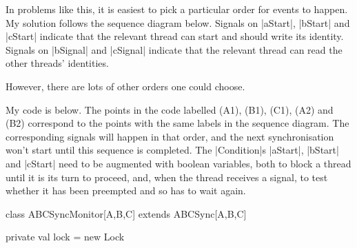 \begin{answerI}
In problems like this, it is easiest to pick a particular order for events to
happen.  My solution follows the sequence diagram below.  Signals on |aStart|,
|bStart| and |cStart| indicate that the relevant thread can start and should
write its identity.  Signals on |bSignal| and |cSignal| indicate that the
relevant thread can read the other threads' identities. 
%
\begin{center}
\def\nodestyle{\small\scalacolour}
\def\labelstyle{\footnotesize\scalacolour}
\def\write#1#2{
  \draw[fill] #1 ellipse (0.6pt and 2.4pt); %
  \draw #1 node[right]{\nodestyle write \scalashape #2};
}
\def\height{10.7}
\end{center}
%
However, there are lots of other orders one could choose. 

My code is below.  The points in the code labelled (A1), (B1), (C1), (A2) and
(B2) correspond to the points with the same labels in the sequence diagram.
The corresponding signals will happen in that order, and the next
synchronisation won't start until this sequence is completed.  The
|Condition|s |aStart|, |bStart| and |cStart| need to be augmented with boolean
variables, both to block a thread until it is its turn to proceed, and, when
the thread receives a signal, to test whether it has been preempted and so has
to wait again.
%
\begin{scala}
class ABCSyncMonitor[A,B,C] extends ABCSync[A,B,C]{
  private val lock = new Lock

}
\end{scala}
\end{answerI}
